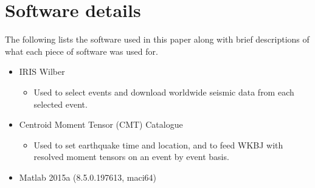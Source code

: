 \documentclass[11pt,a4paper]{article}
\begin{document}
\section{Software details}
\label{app:Software}
The following lists the software used in this paper along with brief descriptions of what each piece of software was used for.
\begin{itemize}
	\item IRIS Wilber
	\begin{itemize}
		\item Used to select events and download worldwide seismic data from each selected event.
	\end{itemize}
	\item Centroid Moment Tensor (CMT) Catalogue
	\begin{itemize}
		\item Used to set earthquake time and location, and to feed WKBJ with resolved moment tensors on an event by event basis.
	\end{itemize}
	\item Matlab 2015a (8.5.0.197613, maci64)
\end{itemize}

\newpage


\end{document}
